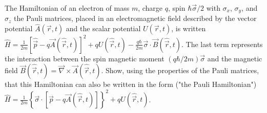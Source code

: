 \documentclass[10pt,a4paper]{article}
\newenvironment{problem}[2][Problem]{\begin{trivlist}
\item[\hskip \labelsep {\bfseries #1}\hskip \labelsep {\bfseries #2.}]}{\end{trivlist}}
\begin{document}
\begin{problem}{3}
[C-T Exercise 9-3] The Hamiltonian of an electron of mass $m$, charge $q$, spin $\hbar\vec{\sigma}/2$ with $\sigma_x$, $\sigma_y$, and $\sigma_z$ the Pauli matrices, placed in an electromagnetic field described by the vector potential $\hat{A}(\vec{r},t)$ and the scalar potential $U(\vec{r},t)$, is written $\hat{H}=\frac{1}{2m}[\hat{\vec{p}}-q\vec{A}(\hat{\vec{r}},t)]^2+qU(\hat{\vec{r}},t)-\frac{q\hbar}{2m}\vec{\sigma}\cdot\vec{B}(\hat{\vec{r}},t)$. The last term represents the interaction between the spin magnetic moment $(q\hbar/2m)\vec{\sigma}$ and the magnetic field $\vec{B}(\hat{\vec{r}},t)=\vec{\nabla}\times\vec{A}(\hat{\vec{r}},t)$. Show, using the properties of the Pauli matrices, that this Hamiltonian can also be written in the form ("the Pauli Hamiltonian") $\hat{H}=\frac{1}{2m}\left\{\vec{\sigma}\cdot[\hat{\vec{p}}-q\vec{A}(\hat{\vec{r}},t)]\right\}^2+qU(\hat{\vec{r}},t)$.
\end{problem}
\end{document}
